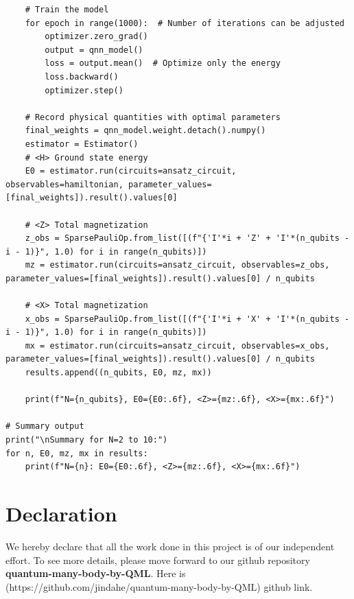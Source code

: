 \documentclass[pre,twocolumn,floatfix]{revtex4-1}
\begin{document}
\begin{lstlisting}
    # Train the model
    for epoch in range(1000):  # Number of iterations can be adjusted
        optimizer.zero_grad()
        output = qnn_model()
        loss = output.mean()  # Optimize only the energy
        loss.backward()
        optimizer.step()

    # Record physical quantities with optimal parameters
    final_weights = qnn_model.weight.detach().numpy()
    estimator = Estimator()
    # <H> Ground state energy
    E0 = estimator.run(circuits=ansatz_circuit, observables=hamiltonian, parameter_values=[final_weights]).result().values[0]

    # <Z> Total magnetization
    z_obs = SparsePauliOp.from_list([(f"{'I'*i + 'Z' + 'I'*(n_qubits - i - 1)}", 1.0) for i in range(n_qubits)])
    mz = estimator.run(circuits=ansatz_circuit, observables=z_obs, parameter_values=[final_weights]).result().values[0] / n_qubits

    # <X> Total magnetization
    x_obs = SparsePauliOp.from_list([(f"{'I'*i + 'X' + 'I'*(n_qubits - i - 1)}", 1.0) for i in range(n_qubits)])
    mx = estimator.run(circuits=ansatz_circuit, observables=x_obs, parameter_values=[final_weights]).result().values[0] / n_qubits
    results.append((n_qubits, E0, mz, mx))
    
    print(f"N={n_qubits}, E0={E0:.6f}, <Z>={mz:.6f}, <X>={mx:.6f}")

# Summary output
print("\nSummary for N=2 to 10:")
for n, E0, mz, mx in results:
    print(f"N={n}: E0={E0:.6f}, <Z>={mz:.6f}, <X>={mx:.6f}")
\end{lstlisting}

\section{Declaration}
We hereby declare that all the work done in this project is of our independent effort. To see more details, please move forward to our github repository \textbf{quantum-many-body-by-QML}. Here is (https://github.com/jindahe/quantum-many-body-by-QML) github link.
\end{document}
